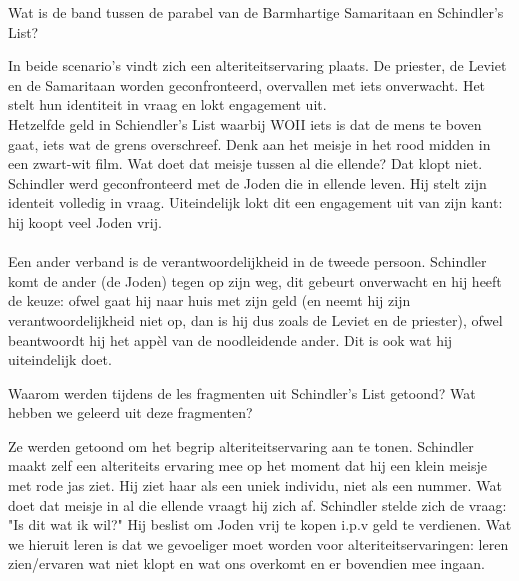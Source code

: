 \documentclass[main.tex]{subfiles}
\begin{document}
\begin{examenvraag}
    \begin{vraag}
        Wat is de band tussen de parabel van de Barmhartige Samaritaan en Schindler’s List?
    \end{vraag}

    \begin{antwoord}
		In beide scenario's vindt zich een alteriteitservaring plaats. De priester, de Leviet en de Samaritaan worden geconfronteerd, overvallen met iets onverwacht. Het stelt hun identiteit in vraag en lokt engagement uit.\\
		Hetzelfde geld in Schiendler's List waarbij WOII iets is dat de mens te boven gaat, iets wat de grens overschreef.
		Denk aan het meisje in het rood midden in een zwart-wit film. Wat doet dat meisje tussen al die ellende? Dat klopt niet. Schindler werd geconfronteerd met de Joden die in ellende leven. Hij stelt zijn identeit volledig in vraag. Uiteindelijk lokt dit een engagement uit van zijn kant: hij koopt veel Joden vrij.
		\\
		\\
		Een ander verband is de verantwoordelijkheid in de tweede persoon.
		Schindler komt de ander‭ ‬(de Joden‭) ‬tegen op zijn weg,‭ ‬dit gebeurt 
		onverwacht en hij heeft de keuze:‭ ‬ofwel gaat hij naar huis met zijn 
		geld‭ (‬en neemt hij zijn verantwoordelijkheid niet op,‭ ‬dan is hij dus 
		zoals de Leviet en de priester‭)‬,‭ ‬ofwel‭ ‬beantwoordt hij het appèl van 
		de noodleidende ander.‭ ‬Dit is ook wat hij uiteindelijk doet.
    \end{antwoord}
\end{examenvraag}


\begin{examenvraag}
    \begin{vraag}
        Waarom werden tijdens de les fragmenten uit Schindler’s List getoond? Wat hebben we geleerd uit deze fragmenten?
    \end{vraag}

    \begin{antwoord}
    Ze werden getoond om het begrip alteriteitservaring aan te tonen. 
    Schindler maakt zelf een alteriteits ervaring mee op het moment dat hij 
    een klein meisje met rode jas ziet. Hij ziet haar als een uniek individu, 
    niet als een nummer. Wat doet dat meisje in al die ellende vraagt hij 
    zich af.
		Schindler stelde zich de vraag: "Is dit wat ik wil?" Hij beslist om 
		Joden vrij te kopen i.p.v geld te verdienen. Wat we hieruit leren is 
		dat we gevoeliger moet worden voor alteriteitservaringen: leren 
		zien/ervaren wat niet klopt en wat ons overkomt en er bovendien mee 
		ingaan.
    \end{antwoord}
\end{examenvraag}
\end{document}
